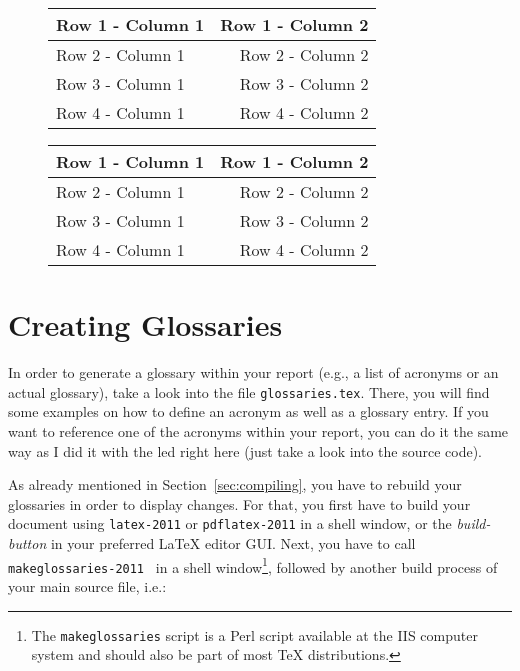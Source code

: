 \begin{figure}
  \begin{minipage}{0.49\textwidth}
    \label{tbl:left}
    \centering\begin{tabular}{@{}lr@{}} \toprule
      Row 1 - Column 1 & Row 1 - Column 2 \\ \midrule
      Row 2 - Column 1 & Row 2 - Column 2 \\
      Row 3 - Column 1 & Row 3 - Column 2 \\
      Row 4 - Column 1 & Row 4 - Column 2 \\ \bottomrule
    \end{tabular}
  \end{minipage} \hfill
  \begin{minipage}{0.49\textwidth}
    \label{tbl:right}
    \centering\begin{tabular}{@{}lr@{}} \toprule
      Row 1 - Column 1 & Row 1 - Column 2 \\ \midrule
      Row 2 - Column 1 & Row 2 - Column 2 \\
      Row 3 - Column 1 & Row 3 - Column 2 \\
      Row 4 - Column 1 & Row 4 - Column 2 \\ \bottomrule
    \end{tabular}
  \end{minipage}
\end{figure}

\section{Creating Glossaries}

In order to generate a glossary within your report (e.g., a list of
acronyms or an actual glossary), take a look into the file
\texttt{glossaries.tex}. There, you will find some examples on how to
define an acronym as well as a glossary entry. If you want to
reference one of the acronyms within your report, you can do it the
same way as I did it with the \gls{led} right here (just take a look
into the source code).

As already mentioned in Section~\ref{sec:compiling}, you have to
rebuild your glossaries in order to display changes. For that, you
first have to build your document using \texttt{latex-2011} or
\texttt{pdflatex-2011} in a shell window, or the \textit{build-button}
in your preferred \LaTeX{} editor GUI. Next, you have to call
\texttt{makeglossaries-2011 } in a shell
window\footnote{The \texttt{makeglossaries} script is a Perl script
  available at the IIS computer system and should also be part of most
  \TeX{} distributions.}, followed by another build process of your
main source file, i.e.:

